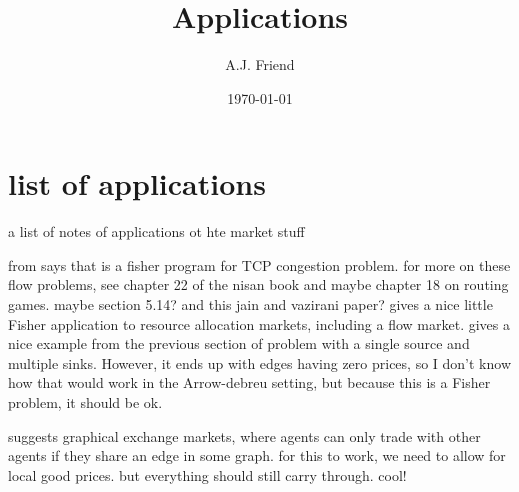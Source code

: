 \documentclass[12pt]{article}
\title{Applications}
\author{A.J. Friend}
\date{\today}
\begin{document}
\maketitle

\section{list of applications}
a list of notes of applications ot hte market stuff

from \cite[p.~104]{nisan2007algorithmic} says that \cite{kelly1997charging}
is a fisher program for TCP congestion problem. for more on these flow problems,
see chapter 22 of the nisan book and maybe chapter 18 on routing games. maybe
section 5.14? and this jain and vazirani paper?
\cite[\S5.13]{nisan2007algorithmic} gives a nice little Fisher application
to resource allocation markets, including a flow market.
\cite[\S5.14]{nisan2007algorithmic} gives a nice example from the previous
section of problem with a single
source and multiple sinks. However, it ends up with edges having zero prices,
so I don't know how that would work in the Arrow-debreu setting, but because
this is a Fisher problem, it should be ok.

\cite[\S7.5]{nisan2007algorithmic} suggests graphical exchange markets, where
agents can only trade with other agents if they share an edge in some graph.
for this to work, we need to allow for local good prices. but everything should
still carry through. cool!




\end{document}
